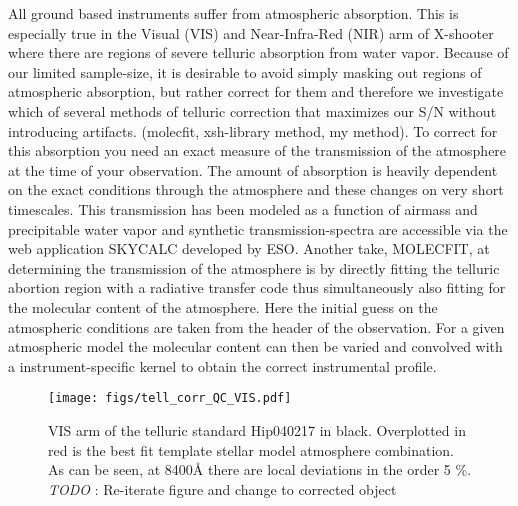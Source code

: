 \documentclass{aa}    %
\newcommand{\figlabel}[1]{\label{fig:#1}}
\newcommand{\todo}[3]{{\color{#2}\emph{#1}: #3}}
\newcommand{\jstodo}[1]{\todo{ \\TODO }{red}{#1}}
\begin{document}
All ground based instruments suffer from atmospheric absorption. This is especially true in the Visual (VIS) and Near-Infra-Red (NIR) arm of X-shooter where there are regions of severe telluric absorption from water vapor. 
Because of our limited sample-size, it is desirable to avoid simply masking out regions of atmospheric absorption, but rather correct for them and therefore we investigate which of several methods of telluric correction that maximizes our S/N without introducing artifacts. (molecfit, xsh-library method, my method). 
To correct for this absorption you need an exact measure of the transmission of the atmosphere at the time of your observation. 
The amount of absorption is heavily dependent on the exact conditions through the atmosphere and these changes on very short timescales. This transmission has been modeled as a function of airmass and precipitable water vapor and synthetic transmission-spectra are accessible via the web application SKYCALC developed by ESO. 
 Another take, MOLECFIT, at determining the transmission of the atmosphere is by directly fitting the telluric abortion region with a radiative transfer code thus simultaneously also fitting for the molecular content of the atmosphere. 
 Here the initial guess on the atmospheric conditions are taken from the header of the observation. 
 For a given atmospheric model the molecular content can then be varied and convolved with a instrument-specific kernel to obtain the correct instrumental profile. 



\begin{figure}[hbtp]
  \centering
  \texttt{[image: figs/tell\_corr\_QC\_VIS.pdf]}
  \caption[]{VIS arm of the telluric standard Hip040217 in black. Overplotted in red is the best fit template stellar model atmosphere combination. As can be seen, at 8400\r{A}  there are local deviations in the order 5 \%. \jstodo{Re-iterate figure and change to corrected object} }
\figlabel{telluric_qc}
\end{figure}
\end{document}

